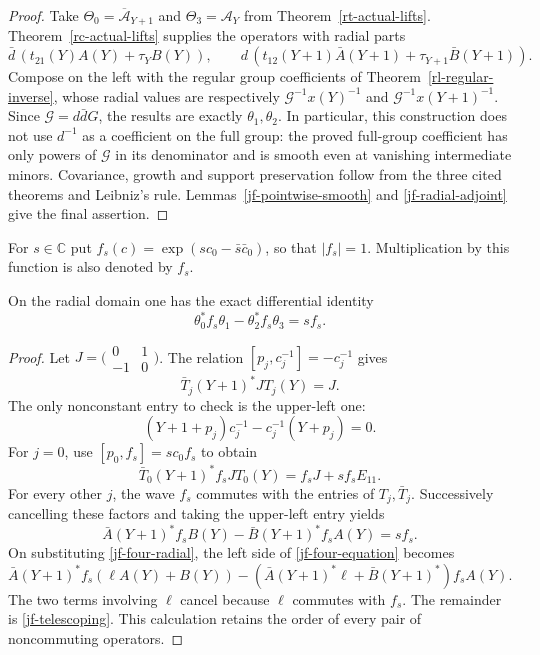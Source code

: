 \begin{proof}
Take \(\Theta_0=\overline{\mathcal A}_{Y+1}\) and
\(\Theta_3=\mathcal A_Y\) from
Theorem~\ref{rt-actual-lifts}.  Theorem~\ref{rc-actual-lifts}
supplies the operators with radial parts
\[
 \bar d\,(t_{21}(Y)A(Y)+\tau_Y B(Y)),\qquad
 d\,(t_{12}(Y+1)\bar A(Y+1)+\tau_{Y+1}\bar B(Y+1)).
\]
Compose on the left with the regular group coefficients
of Theorem~\ref{rl-regular-inverse}, whose radial values
are respectively
\(\mathcal G^{-1}x(Y)^{-1}\) and
\(\mathcal G^{-1}x(Y+1)^{-1}\).
Since \(\mathcal G=d\bar dG\), the results are exactly
\(\theta_1,\theta_2\).  In particular, this construction
does not use \(d^{-1}\) as a coefficient on the full group:
the proved full-group coefficient has only powers of
\(\mathcal G\) in its denominator and is smooth even at
vanishing intermediate minors.  Covariance, growth and
support preservation follow from the three cited theorems
and Leibniz's rule.  Lemmas~\ref{jf-pointwise-smooth} and
\ref{jf-radial-adjoint} give the final assertion.
\end{proof}

For \(s\in\mathbb C\) put
\(f_s(c)=\exp(sc_0-\bar s\bar c_0)\), so that
\(|f_s|=1\).  Multiplication by this function is also
denoted by \(f_s\).

\begin{lemma}\label{jf-four-identity}
On the radial domain one has the exact differential identity
\begin{equation}\label{jf-four-equation}
             \theta_0^*f_s\theta_1
                   -\theta_2^*f_s\theta_3=s f_s.
\end{equation}
\end{lemma}

\begin{proof}
Let \(J=\bigl(\begin{smallmatrix}0&1\\-1&0\end{smallmatrix}\bigr)\).
The relation \([p_j,c_j^{-1}]=-c_j^{-1}\) gives
\[
                  \bar T_j(Y+1)^*JT_j(Y)=J.
\]
The only nonconstant entry to check is the upper-left one:
\[
       (Y+1+p_j)c_j^{-1}-c_j^{-1}(Y+p_j)=0.
\]
For \(j=0\), use \([p_0,f_s]=sc_0f_s\) to obtain
\[
             \bar T_0(Y+1)^*f_sJT_0(Y)=f_sJ+s f_sE_{11}.
\]
For every other \(j\), the wave \(f_s\) commutes with
the entries of \(T_j,\bar T_j\).  Successively cancelling
these factors and taking the upper-left entry yields
\begin{equation}\label{jf-telescoping}
          \bar A(Y+1)^*f_s B(Y)
             -\bar B(Y+1)^*f_s A(Y)=s f_s.
\end{equation}
On substituting \eqref{jf-four-radial}, the left side of
\eqref{jf-four-equation} becomes
\[
 \bar A(Y+1)^*f_s(\ell A(Y)+B(Y))
        -(\bar A(Y+1)^*\ell+\bar B(Y+1)^*)f_sA(Y).
\]
The two terms involving \(\ell\) cancel because \(\ell\)
commutes with \(f_s\).  The remainder is
\eqref{jf-telescoping}.  This calculation retains the
order of every pair of noncommuting operators.
\end{proof}

